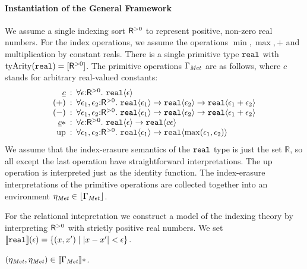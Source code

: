 \paragraph{Instantiation of the General Framework}
We assume a single indexing sort $\mathsf{R}^{>0}$ %
to represent positive, non-zero real numbers. For the index
operations, we assume the operations $\min, \max, +$ and
multiplication by constant reals. There is a single primitive type
$\textup{\texttt{real}}$ with $\mathrm{tyArity}(\textup{\texttt{real}}) =
[\mathsf{R}^{>0}]$. The primitive operations $\Gamma_{\mathit{Met}}$ are as
follows, where $c$ stands for arbitrary real-valued constants:
\begin{displaymath}
  \begin{array}{r@{\hspace{0.5em}:\hspace{0.5em}}l}
    \underline{c} & \forall \epsilon\mathord:\metricSort.\ \tyPrim{real}{\epsilon} \\
    (+) & \forall \epsilon_1, \epsilon_2\mathord:\metricSort.\ \tyPrim{real}{\epsilon_1} \to \tyPrim{real}{\epsilon_2} \to \tyPrim{real}{\epsilon_1 + \epsilon_2} \\
    (-) & \forall \epsilon_1, \epsilon_2\mathord:\metricSort.\ \tyPrim{real}{\epsilon_1} \to \tyPrim{real}{\epsilon_2} \to \tyPrim{real}{\epsilon_1 + \epsilon_2} \\
    \underline{c} * & \forall \epsilon\mathord:\metricSort.\ \tyPrim{real}{\epsilon} \to \tyPrim{real}{c\epsilon} \\
    \mathrm{up} & \forall \epsilon_1,\epsilon_2\mathord:\metricSort.\ \tyPrim{real}{\epsilon_1} \to \tyPrim{real}{\max(\epsilon_1,\epsilon_2)}
  \end{array}
\end{displaymath}
We assume that the index-erasure semantics of the $\textup{\texttt{real}}$
type is just the set $\mathbb{R}$, so all except the last operation
have straightforward interpretations. The $\mathrm{up}$ operation is
interpreted just as the identity function. The index-erasure
interpretations of the primitive operations are collected together
into an environment $\eta_{\mathit{Met}} \in \left\lfloor \Gamma_{\mathit{Met}} \right\rfloor$.

For the relational intepretation we construct a model of the indexing
theory by interpreting $\mathsf{R}^{>0}$ with strictly positive real
numbers. We set $\llbracket \textup{\texttt{real}} \rrbracket(\epsilon) = \{ (x,x') \mathrel|
\lvert x - x' \rvert < \epsilon \}$.
\begin{lemma}\label{lem:metric-environments}
  $(\eta_{\mathit{Met}}, \eta_{\mathit{Met}}) \in \llbracket \Gamma_{\mathit{Met}} \rrbracket{}*$.
\end{lemma}

